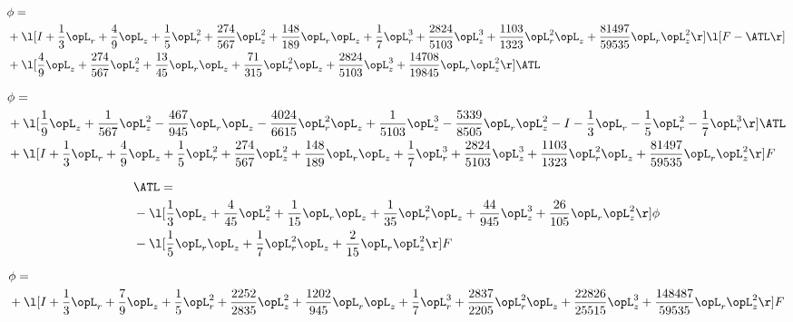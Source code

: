 \begin{alignat}{2} 
\label{eq:scalarFlux_3} 
& \phi = \\ 
& + \l[ I + \frac{1}{3} \opL_r + \frac{4}{9} \opL_z + \frac{1}{5} \opL_r^{2} + \frac{274}{567} \opL_z^{2} + \frac{148}{189} \opL_r \opL_z + \frac{1}{7} \opL_r^{3} + \frac{2824}{5103} \opL_z^{3} + \frac{1103}{1323} \opL_r^{2} \opL_z + \frac{81497}{59535} \opL_r \opL_z^{2}  \r] \l[ F - \ATL \r] \nonumber \\ 
& + \l[ \frac{4}{9} \opL_z + \frac{274}{567} \opL_z^{2} + \frac{13}{45} \opL_r \opL_z + \frac{71}{315} \opL_r^{2} \opL_z + \frac{2824}{5103} \opL_z^{3} + \frac{14708}{19845} \opL_r \opL_z^{2}  \r] \ATL \nonumber \\ 
\end{alignat} 


\begin{alignat}{2} 
\label{eq:scalarFlux_4} 
& \phi = \\ 
& + \l[ \frac{1}{9} \opL_z + \frac{1}{567} \opL_z^{2} - \frac{467}{945} \opL_r \opL_z - \frac{4024}{6615} \opL_r^{2} \opL_z + \frac{1}{5103} \opL_z^{3} - \frac{5339}{8505} \opL_r \opL_z^{2} - I - \frac{1}{3} \opL_r - \frac{1}{5} \opL_r^{2} - \frac{1}{7} \opL_r^{3}  \r] \ATL \nonumber \\ 
& + \l[ I + \frac{1}{3} \opL_r + \frac{4}{9} \opL_z + \frac{1}{5} \opL_r^{2} + \frac{274}{567} \opL_z^{2} + \frac{148}{189} \opL_r \opL_z + \frac{1}{7} \opL_r^{3} + \frac{2824}{5103} \opL_z^{3} + \frac{1103}{1323} \opL_r^{2} \opL_z + \frac{81497}{59535} \opL_r \opL_z^{2}  \r] F \nonumber \\ 
\end{alignat} 


\begin{alignat}{2} 
\label{eq:isoATL_1} 
& \ATL = \\ 
& - \l[ \frac{1}{3} \opL_z + \frac{4}{45} \opL_z^{2} + \frac{1}{15} \opL_r \opL_z + \frac{1}{35} \opL_r^{2} \opL_z + \frac{44}{945} \opL_z^{3} + \frac{26}{105} \opL_r \opL_z^{2}  \r] \phi \nonumber \\ 
& - \l[ \frac{1}{5} \opL_r \opL_z + \frac{1}{7} \opL_r^{2} \opL_z + \frac{2}{15} \opL_r \opL_z^{2}  \r] F \nonumber \\ 
\end{alignat} 


\begin{alignat}{2} 
\label{eq:scalarFlux_5} 
& \phi = \\ 
& + \l[ I + \frac{1}{3} \opL_r + \frac{7}{9} \opL_z + \frac{1}{5} \opL_r^{2} + \frac{2252}{2835} \opL_z^{2} + \frac{1202}{945} \opL_r \opL_z + \frac{1}{7} \opL_r^{3} + \frac{2837}{2205} \opL_r^{2} \opL_z + \frac{22826}{25515} \opL_z^{3} + \frac{148487}{59535} \opL_r \opL_z^{2}  \r] F \nonumber \\ 
\end{alignat} 


